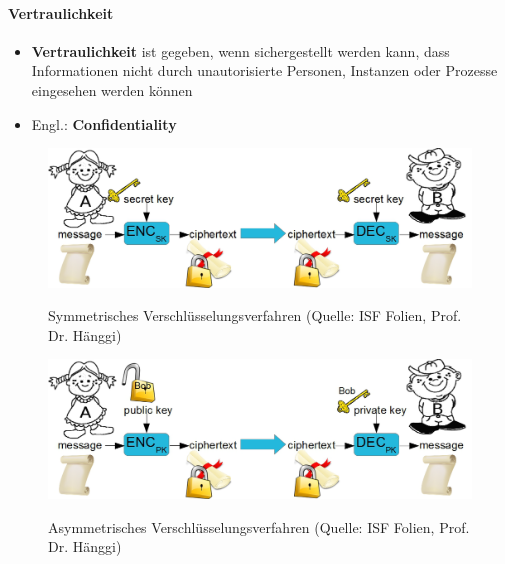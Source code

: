 \paragraph*{Vertraulichkeit}\label{par:Confidentiality}
\begin{itemize}
    \item \textbf{Vertraulichkeit} ist gegeben, wenn sichergestellt werden kann, dass Informationen nicht durch unautorisierte Personen, Instanzen oder Prozesse eingesehen werden können
    \item Engl.: \textbf{Confidentiality}
\end{itemize}
\begin{figure}[H]
    \begin{center}
    \label{pic:SymmetricEncryption}
    \includegraphics[width=\textwidth]{images/secretkey.png}
    \caption{Symmetrisches Verschlüsselungsverfahren (Quelle: ISF Folien, Prof. Dr. Hänggi)}
    \end{center}
\end{figure}
\begin{figure}[H]
    \begin{center}
    \label{pic:AsymmetricEncryption}
    \includegraphics[width=\textwidth]{images/publickey.png}
    \caption{Asymmetrisches Verschlüsselungsverfahren (Quelle: ISF Folien, Prof. Dr. Hänggi)}
    \end{center}
\end{figure}

